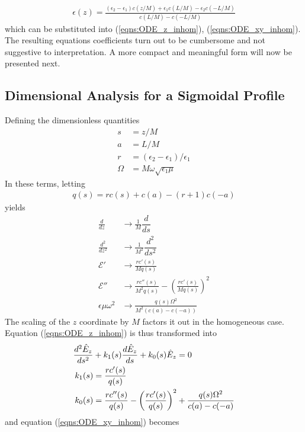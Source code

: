 \documentclass[twocolumn,secnumarabic,amssymb, nobibnotes, aps, prd]{revtex4-1}
\begin{document}
\begin{align}
\epsilon(z)=\frac{(\epsilon_2 - \epsilon_1)c(z/M)+\epsilon_1 c(L/M)-\epsilon_2 c(-L/M)}{c(L/M)-c(-L/M)}
\label{eqns:eps_z_dim_profile}
\end{align}
which can be substituted into (\ref{eqns:ODE_z_inhom}), (\ref{eqns:ODE_xy_inhom}). The resulting equations coefficients turn out to be cumbersome and not suggestive to interpretation. A more compact and meaningful form will now be presented next.

  

\subsection{Dimensional Analysis for a Sigmoidal Profile}
Defining the dimensionless quantities 
\begin{subequations}
\begin{align}
s &= z/M \label{eqns:def_nd_sigmoid_s} \\
a &= L/M \label{eqns:def_nd_sigmoid_a} \\
r &= (\epsilon_2 - \epsilon_1)/\epsilon_1 \label{eqns:def_nd_sigmoid_r} \\
\Omega &= M \omega \sqrt{\epsilon_1 \mu} \label{eqns:def_nd_sigmoid_W} 
\end{align}
\end{subequations}
In these terms, letting
\begin{align}
q(s) = rc(s)+c(a)-(r+1)c(-a)
\label{eqns:eps_simp}
\end{align}
yields
\begin{align*}
\frac{d}{dz} &\rightarrow \frac{1}{M}\dfrac{d}{ds} \\
\frac{d^2}{dz^2} &\rightarrow \frac{1}{M^2}\dfrac{d^2}{ds^2} \\
\mathcal{E}' &\rightarrow \frac{r c'(s)}{M q(s)}	\\
\mathcal{E}'' &\rightarrow \frac{r c''(s)}{M^2 q(s)} - \left( \frac{r c'(s)}{M q(s)}\right)^2 \\
\epsilon \mu \omega^2 &\rightarrow \frac{q(s) \Omega ^2}{M^2 (c(a)-c(-a))}
\end{align*}
The scaling of the $z$ coordinate by $M$ factors it out in the  homogeneous case. Equation (\ref{eqns:ODE_z_inhom}) is thus transformed into 
\begin{align}
\label{eqns:ODE_Ez_DimGroup}
\frac{d^2 \hat{E}_z}{ds^2} & + k_1(s) \frac{d \hat{E}_z}{ds} + k_0(s) \hat{E}_z = 0 \\
k_1(s) &= \frac{r c'(s)}{q(s)} \notag \\
k_0(s) &=   \frac{r c''(s)}{q(s)} - \left( \frac{r c'(s)}{ q(s)}\right)^2 + \frac{q(s) \Omega ^2}{c(a)-c(-a)}   \notag
\end{align}
and equation (\ref{eqns:ODE_xy_inhom}) becomes
\end{document}
